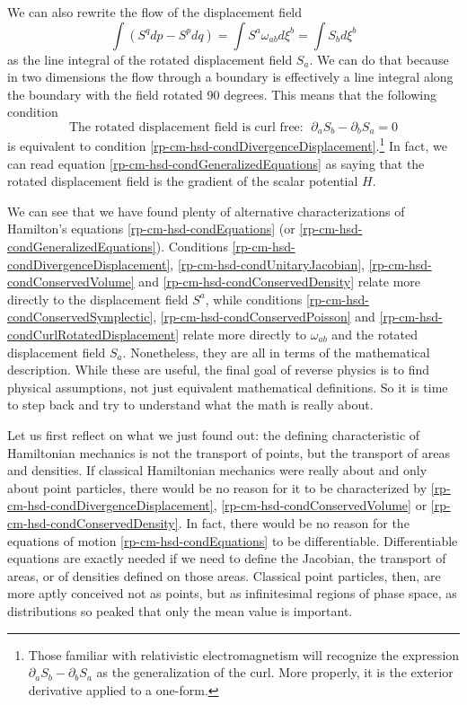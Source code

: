 We can also rewrite the flow of the displacement field
\begin{equation}
	\int \left( S^q dp - S^p dq \right) = \int S^a \omega_{ab} d\xi^b = \int S_b d\xi^b
\end{equation}
as the line integral of the rotated displacement field $S_a$. We can do that because in two dimensions the flow through a boundary is effectively a line integral along the boundary with the field rotated 90 degrees. This means that the following condition
\begin{equation}\label{rp-cm-hsd-condCurlRotatedDisplacement}
	\tag{HM-8}
	\text{The rotated displacement field is curl free: } \; \partial_a S_b - \partial_b S_a = 0
\end{equation}
is equivalent to condition \ref{rp-cm-hsd-condDivergenceDisplacement}.\footnote{Those familiar with relativistic electromagnetism will recognize the expression $\partial_a S_b - \partial_b S_a$ as the generalization of the curl. More properly, it is the exterior derivative applied to a one-form.} In fact, we can read equation \ref{rp-cm-hsd-condGeneralizedEquations} as saying that the rotated displacement field is the gradient of the scalar potential $H$.

We can see that we have found plenty of alternative characterizations of Hamilton's equations \ref{rp-cm-hsd-condEquations} (or \ref{rp-cm-hsd-condGeneralizedEquations}). Conditions  \ref{rp-cm-hsd-condDivergenceDisplacement}, \ref{rp-cm-hsd-condUnitaryJacobian}, \ref{rp-cm-hsd-condConservedVolume} and \ref{rp-cm-hsd-condConservedDensity} relate more directly to the displacement field $S^a$, while conditions \ref{rp-cm-hsd-condConservedSymplectic}, \ref{rp-cm-hsd-condConservedPoisson} and \ref{rp-cm-hsd-condCurlRotatedDisplacement} relate more directly to $\omega_{ab}$ and the rotated displacement field $S_a$. Nonetheless, they are all in terms of the mathematical description. While these are useful, the final goal of reverse physics is to find physical assumptions, not just equivalent mathematical definitions. So it is time to step back and try to understand what the math is really about.

Let us first reflect on what we just found out: the defining characteristic of Hamiltonian mechanics is not the transport of points, but the transport of areas and densities. If classical Hamiltonian mechanics were really about and only about point particles, there would be no reason for it to be characterized by \ref{rp-cm-hsd-condDivergenceDisplacement}, \ref{rp-cm-hsd-condConservedVolume} or \ref{rp-cm-hsd-condConservedDensity}. In fact, there would be no reason for the equations of motion \ref{rp-cm-hsd-condEquations} to be differentiable. Differentiable equations are exactly needed if we need to define the Jacobian, the transport of areas, or of densities defined on those areas. Classical point particles, then, are more aptly conceived not as points, but as infinitesimal regions of phase space, as distributions so peaked that only the mean value is important.

